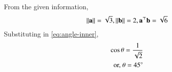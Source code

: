 From the given information,
\begin{align}
\left\lVert\mathbf{a}\right\rVert=\sqrt{3},
\left\lVert\mathbf{b}\right\rVert= 2,
{\mathbf{a}^{\top}}{\mathbf{b}}=\sqrt{6}  
\end{align}
	Substituting in \eqref{eq:angle-inner},
\begin{align}
	\cos \theta 
=\frac{1}{\sqrt{2}}\\
	\text{or, }\theta={45}\degree
\end{align}

